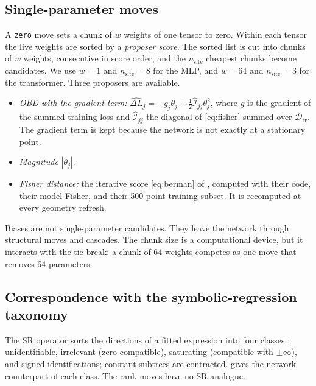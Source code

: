 \documentclass[11pt,a4paper]{article}
\theoremstyle{definition}
\newcommand{\D}{\mathcal{D}}
\newcommand{\Fis}{\mathcal{I}}
\newcommand{\Fhat}{\widehat{\Fis}}
\newcommand{\Dtr}{\D_{\mathrm{tr}}}
\newcommand{\code}[1]{\texttt{#1}}
\begin{document}
\subsection{Single-parameter moves}
\label{sec:moves-weights}

A \code{zero} move sets a chunk of $w$ weights of one tensor to zero. Within each tensor
the live weights are sorted by a \emph{proposer score}. The sorted list is cut into
chunks of $w$ weights, consecutive in score order, and the $n_{\mathrm{site}}$ cheapest
chunks become candidates. We use $w=1$ and
$n_{\mathrm{site}}=8$ for the MLP, and $w=64$ and $n_{\mathrm{site}}=3$ for the
transformer. Three proposers are available.
\begin{itemize}
\item \emph{OBD with the gradient term:}
$\widehat{\Delta L}_j=-g_j\theta_j+\tfrac12\Fhat_{jj}\theta_j^2$, where $g$ is the
gradient of the summed training loss and $\Fhat_{jj}$ the diagonal of \eqref{eq:fisher}
summed over $\Dtr$. The gradient term is kept because the network is not exactly at a
stationary point.
\item \emph{Magnitude} $|\theta_j|$.
\item \emph{Fisher distance:} the iterative score \eqref{eq:berman} of
\citet{berman2026fdist}, computed with their code, their model Fisher, and their
500-point training subset. It is recomputed at every geometry refresh.
\end{itemize}
Biases are not single-parameter candidates. They leave the network through structural
moves and cascades. The chunk size is a computational device, but it interacts with the
tie-break: a chunk of 64 weights competes as one move that removes 64 parameters.

\subsection{Correspondence with the symbolic-regression taxonomy}
\label{sec:taxonomy}

The SR operator sorts the directions of a fitted expression into four classes
\citep{guidetti2026emergent}: unidentifiable, irrelevant (zero-compatible), saturating
(compatible with $\pm\infty$), and signed identifications; constant subtrees are
contracted.  gives the network counterpart of each class. The
rank moves have no SR analogue.
\end{document}
